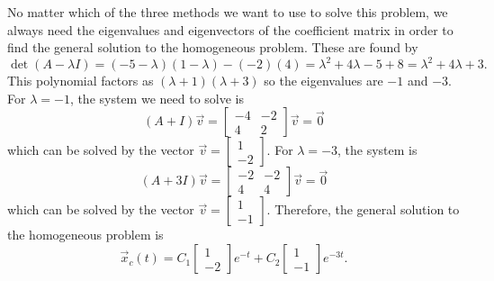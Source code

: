 \begin{exampleSol}
No matter which of the three methods we want to use to solve this problem, we always need the eigenvalues and eigenvectors of the coefficient matrix in order to find the general solution to the homogeneous problem. These are found by
\begin{equation*}
\det(A - \lambda I) = (-5-\lambda)(1-\lambda) - (-2)(4) = \lambda^2 + 4\lambda -5+8 = \lambda^2 + 4\lambda + 3.
\end{equation*}
This polynomial factors as $(\lambda + 1)(\lambda+3)$ so the eigenvalues are $-1$ and $-3$. For $\lambda = -1$, the system we need to solve is
\begin{equation*}
(A + I)\vec{v} = \begin{bmatrix} -4 & -2 \\ 4 & 2 \end{bmatrix}\vec{v} = \vec{0}
\end{equation*}
which can be solved by the vector $\vec{v} = \left[ \begin{smallmatrix} 1 \\ -2 \end{smallmatrix} \right]$. For $\lambda = -3$, the system is
\begin{equation*}
(A + 3I)\vec{v} = \begin{bmatrix} -2 & -2 \\ 4 & 4 \end{bmatrix}\vec{v}  = \vec{0}
\end{equation*}
which can be solved by the vector $\vec{v} = \left[ \begin{smallmatrix} 1 \\ -1 \end{smallmatrix} \right]$. Therefore, the general solution to the homogeneous problem is
\begin{equation} \label{eq:genSolAllEx}
\vec{x}_c(t) = C_1\begin{bmatrix} 1 \\ -2 \end{bmatrix}e^{-t} + C_2\begin{bmatrix} 1 \\ -1 \end{bmatrix}e^{-3t}.
\end{equation}


\end{exampleSol}
